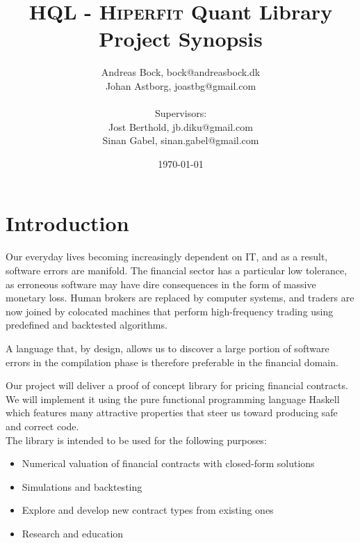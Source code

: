 \documentclass[11pt]{article}
\makeatletter
\def\Author{Andreas Bock, bock@andreasbock.dk\\
Johan Astborg, joastbg@gmail.com\\\\
Supervisors:\\
Jost Berthold, jb.diku@gmail.com\\
Sinan Gabel, sinan.gabel@gmail.com
}
\def\Title{\bf HQL - \textsc{Hiperfit} Quant Library\\ {\Large Project Synopsis}}
\newcommand{\comm}[2]{{\sf \(\spadesuit\){\bf #1: }{\rm \sf #2}\(\spadesuit\)}}
\newcommand{\mcomm}[2]{\marginpar{\scriptsize \comm{#1}{#2}}}
\newcommand{\ab}[1]{\mcomm{AB}{#1}}
\makeatother
\begin{document}
\title{\Title}
\author{\Author}
\date{\today}
\maketitle

\begin{abstract}


\end{abstract}

\section*{Introduction}

Our everyday lives becoming increasingly dependent on IT, and as a result, software
errors are manifold. The financial sector has a particular low tolerance, as erroneous
software may have dire consequences in the form of massive monetary loss.
Human brokers are replaced by computer systems, and traders are now joined by
colocated machines that perform high-frequency trading using predefined and backtested algorithms.\\

A language that, by design, allows us to discover a large portion of software errors in 
the compilation phase is therefore preferable in the financial domain. 

Our project will deliver a proof of concept library for pricing financial contracts.
We will implement it using the pure functional programming language Haskell which features
many attractive properties that steer us toward producing safe and correct code.\\

The library is intended to be used for the following purposes:
\begin{itemize}
\item Numerical valuation of financial contracts with closed-form solutions
\item Simulations and backtesting
\item Explore and develop new contract types from existing ones
\item Research and education
\end{itemize}
\end{document}
